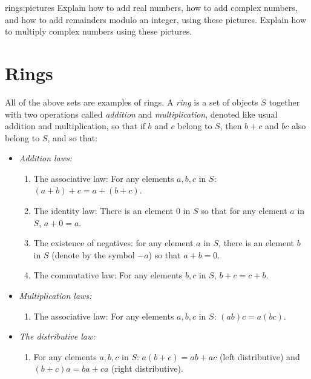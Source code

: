 \begin{problem}{rings:pictures}
Explain how to add real numbers, how to add complex numbers, and how to add remainders modulo an integer, using these pictures.
Explain how to multiply complex numbers using these pictures.
\end{problem}


\section{Rings}
All of the above sets are examples of rings.
A \emph{ring} is a set of objects \(S\) together with two operations called \emph{addition} and \emph{multiplication}, denoted like usual addition and multiplication, so that if \(b\) and \(c\) belong to \(S\), then \(b+c\) and \(bc\) also belong to \(S\), and so that:
\smallskip
\begin{itemize}
\item[]\emph{Addition laws:}
\begin{enumerate}
\item The associative law: For any elements \(a, b, c\) in \(S\): \((a+b)+c=a+(b+c)\).
\item The identity law: There is an element \(0\) in \(S\) so that for any element \(a\) in \(S\), \(a+0=a\).
\item The existence of negatives: for any element \(a\) in \(S\), there is an element \(b\) in \(S\) (denote by the symbol \(-a\)) so that \(a+b=0\).
\item The commutative law: For any elements \(b, c\) in \(S\), \(b+c=c+b\).
\end{enumerate}
\smallskip
\item[]\emph{Multiplication laws:}
\begin{enumerate}
\item The associative law: For any elements \(a, b, c\) in \(S\): \((ab)c=a(bc)\).
\end{enumerate}
\smallskip
\item[]\emph{The distributive law:}
\begin{enumerate}
\item For any elements \(a, b, c\) in \(S\): \(a(b+c)=ab+ac\) (left distributive) and \((b+c)a=ba+ca\) (right distributive).
\end{enumerate}
\end{itemize}
\medskip

